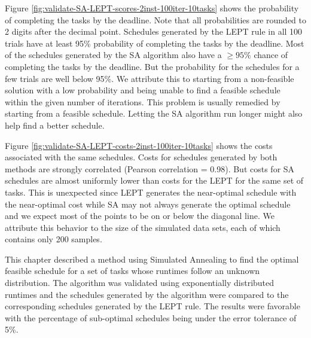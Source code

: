 \documentclass[12pt]{report}
\begin{document}
Figure \ref{fig:validate-SA-LEPT-scores-2inst-100iter-10tasks} shows the probability of completing the tasks by the deadline.
Note that all probabilities are rounded to 2 digits after the decimal point.
Schedules generated by the LEPT rule in all 100 trials have at least 95\% probability of completing the tasks by the deadline.
Most of the schedules generated by the SA algorithm also have a $\geq 95\%$ chance of completing the tasks by the deadline.
But the probability for the schedules for a few trials are well below 95\%.
We attribute this to starting from a non-feasible solution with a low probability and being unable to find a feasible schedule within the given number of iterations.
This problem is usually remedied by starting from a feasible schedule.
Letting the SA algorithm run longer might also help find a better schedule.

Figure \ref{fig:validate-SA-LEPT-costs-2inst-100iter-10tasks} shows the costs associated with the same schedules. 
Costs for schedules generated by both methods are strongly correlated (Pearson correlation = 0.98).
But costs for SA schedules are almost uniformly lower than costs for the LEPT for the same set of tasks.
This is unexpected since LEPT generates the near-optimal schedule with the near-optimal cost while SA may not always generate the optimal schedule and we expect most of the points to be on or below the diagonal line.
We attribute this behavior to the size of the simulated data sets, each of which contains only 200 samples.

This chapter described a method using Simulated Annealing to find the optimal feasible schedule for a set of tasks whose runtimes follow an unknown distribution.
The algorithm was validated using exponentially distributed runtimes and the schedules generated by the algorithm were compared to the corresponding schedules generated by the LEPT rule.
The results were favorable with the percentage of sub-optimal schedules being under the error tolerance of 5\%.
\end{document}

